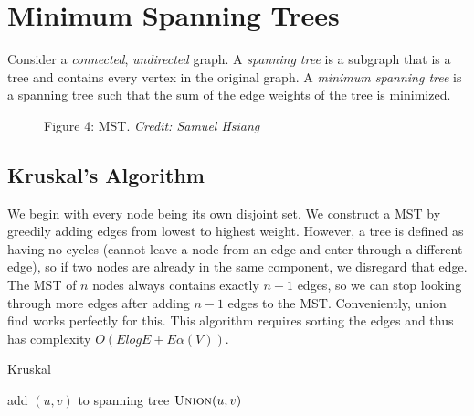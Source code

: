 \documentclass{article}
\begin{document}
\section{Minimum Spanning Trees}
Consider a \textit{connected}, \textit{undirected} graph. A \textit{spanning tree} is a subgraph that is a tree and contains every vertex in the original graph. A \textit{minimum spanning tree} is a spanning tree such that the sum of the edge weights of the tree is minimized. 

\begin{figure}[!htbp]
\centering
{
}
\caption{Figure 4: MST.
\textit{Credit: Samuel Hsiang}}
\end{figure}

\subsection{Kruskal's Algorithm}
We begin with every node being its own disjoint set. We construct a MST by greedily adding edges from lowest to highest weight. However, a tree is defined as having no cycles (cannot leave a node from an edge and enter through a different edge), so if two nodes are already in the same component, we disregard that edge. The MST of $n$ nodes always contains exactly $n-1$ edges, so we can stop looking through more edges after adding $n-1$ edges to the MST. Conveniently, union find works perfectly for this. This algorithm requires sorting the edges and thus has complexity $O(ElogE + E\alpha(V))$. 

\begin{algorithm}[H]
\caption{Kruskal}
\begin{algorithmic}
		\State add $(u,v)$ to spanning tree
		\State $\Call{Union}{u,v}$
	\EndIf
\EndFor
\end{algorithmic}
\end{algorithm}
\end{document}
